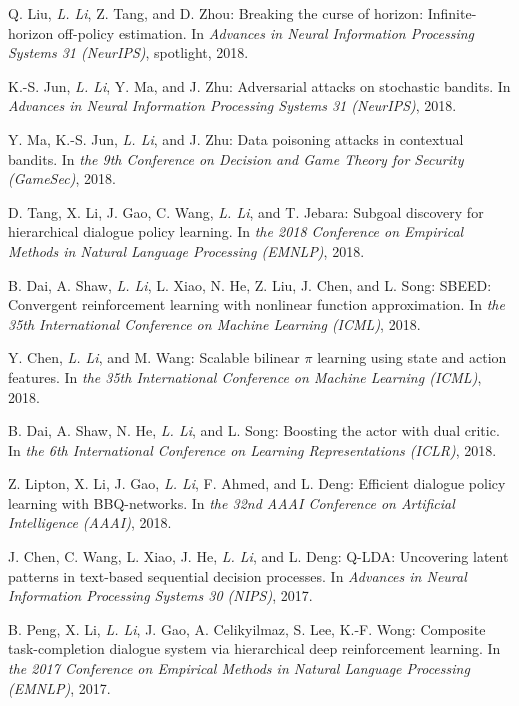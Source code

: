 \documentclass[10pt,twoside,letterpaper]{article}
\newcommand{\selffont}[1]{{\textit{#1}}}
\newcommand{\venuefont}[1]{{\textit{#1}}}
\newcommand{\myself}{\selffont{L. Li}}
\begin{document}
\begin{compactenum}[(C1)]
\item{Q. Liu, \myself, Z. Tang, and D. Zhou: Breaking the curse of horizon: Infinite-horizon off-policy estimation.  In \venuefont{Advances in Neural Information Processing Systems 31 (NeurIPS)}, spotlight, 2018.}

\item{K.-S. Jun, \myself, Y. Ma, and J. Zhu: Adversarial attacks on stochastic bandits.  In \venuefont{Advances in Neural Information Processing Systems 31 (NeurIPS)}, 2018.}

\item{Y. Ma, K.-S. Jun, \myself, and J. Zhu: Data poisoning attacks in contextual bandits. In \venuefont{the 9th Conference on Decision and Game Theory for Security (GameSec)}, 2018.}

\item{D. Tang, X. Li, J. Gao, C. Wang, \myself, and T. Jebara: Subgoal discovery for hierarchical dialogue policy learning. In \venuefont{the 2018 Conference on Empirical Methods in Natural Language Processing (EMNLP)}, 2018.}

\item{B. Dai, A. Shaw, \myself, L. Xiao, N. He, Z. Liu, J. Chen, and L. Song: SBEED: Convergent reinforcement learning with nonlinear function approximation.  In \venuefont{the 35th International Conference on Machine Learning (ICML)}, 2018.}

\item{Y. Chen, \myself, and M. Wang: Scalable bilinear $\pi$ learning using state and action features.  In \venuefont{the 35th International Conference on Machine Learning (ICML)}, 2018.}

\item{B. Dai, A. Shaw, N. He, \myself, and L. Song: Boosting the actor with dual critic. In \venuefont{the 6th International Conference on Learning Representations (ICLR)}, 2018.}

\item{Z. Lipton, X. Li, J. Gao, \myself, F. Ahmed, and L. Deng: Efficient dialogue policy learning with BBQ-networks.  In \venuefont{the 32nd AAAI Conference on Artificial Intelligence (AAAI)}, 2018.}

\item{J. Chen, C. Wang, L. Xiao, J. He, \myself, and L. Deng: Q-LDA: Uncovering latent patterns in text-based sequential decision processes. In \venuefont{Advances in Neural Information Processing Systems 30 (NIPS)}, 2017.}

\item{B. Peng, X. Li, \myself, J. Gao, A. Celikyilmaz, S. Lee, K.-F. Wong: Composite task-completion dialogue system via hierarchical deep reinforcement learning.  In \venuefont{the 2017 Conference on Empirical Methods in Natural Language Processing (EMNLP)}, 2017.}


\end{compactenum}
\end{document}
